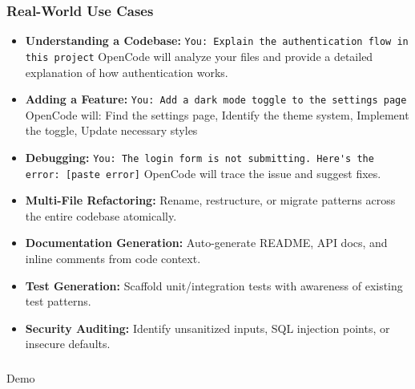 \begin{frame}[fragile]\frametitle{Real-World Use Cases}
  \begin{itemize}
    \item \textbf{Understanding a Codebase:} \lstinline|You: Explain the authentication flow in this project| OpenCode will analyze your files and provide a detailed explanation of how authentication works.
  
    \item \textbf{Adding a Feature:} \lstinline|You: Add a dark mode toggle to the settings page| OpenCode will: Find the settings page, Identify the theme system, Implement the toggle, Update necessary styles

    \item \textbf{Debugging:} \lstinline|You: The login form is not submitting. Here's the error: [paste error]| OpenCode will trace the issue and suggest fixes.
	
    \item \textbf{Multi-File Refactoring:} Rename, restructure, or migrate patterns across the entire codebase atomically.
    \item \textbf{Documentation Generation:} Auto-generate README, API docs, and inline comments from code context.
    \item \textbf{Test Generation:} Scaffold unit/integration tests with awareness of existing test patterns.
    \item \textbf{Security Auditing:} Identify unsanitized inputs, SQL injection points, or insecure defaults.
  \end{itemize}
\end{frame}


\begin{frame}[fragile]\frametitle{}

\begin{center}
{\Large Demo}
\end{center}
\end{frame}

